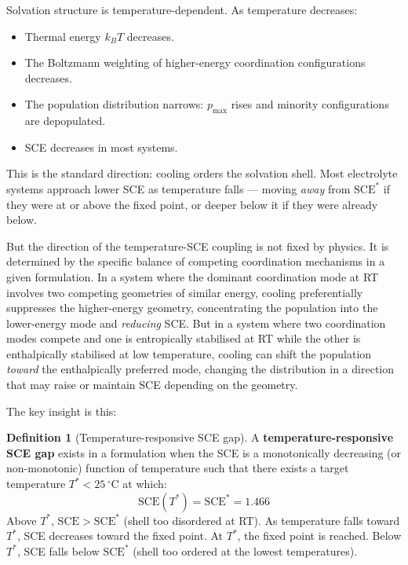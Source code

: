 \documentclass[11pt]{article}
\theoremstyle{plain}
\theoremstyle{definition}
\newtheorem{definition}{Definition}[section]
\theoremstyle{remark}
\begin{document}
Solvation structure is temperature-dependent.  As temperature
decreases:
\begin{itemize}[leftmargin=2em]
  \item Thermal energy $k_BT$ decreases.
  \item The Boltzmann weighting of higher-energy coordination
        configurations decreases.
  \item The population distribution narrows: $p_{\max}$ rises and
        minority configurations are depopulated.
  \item SCE decreases in most systems.
\end{itemize}

This is the standard direction: cooling orders the solvation shell.
Most electrolyte systems approach lower SCE as temperature falls ---
moving \emph{away} from $\mathrm{SCE}^{*}$ if they were at or above
the fixed point, or deeper below it if they were already below.

But the direction of the temperature-SCE coupling is not fixed by
physics.  It is determined by the specific balance of competing
coordination mechanisms in a given formulation.  In a system where
the dominant coordination mode at RT involves two competing geometries
of similar energy, cooling preferentially suppresses the higher-energy
geometry, concentrating the population into the lower-energy mode and
\emph{reducing} SCE.  But in a system where two coordination modes
compete and one is entropically stabilised at RT while the other is
enthalpically stabilised at low temperature, cooling can shift the
population \emph{toward} the enthalpically preferred mode, changing
the distribution in a direction that may raise or maintain SCE
depending on the geometry.

The key insight is this:

\begin{definition}[Temperature-responsive SCE gap]
A \textbf{temperature-responsive SCE gap} exists in a formulation
when the SCE is a monotonically decreasing (or non-monotonic)
function of temperature such that there exists a target temperature
$T^{*} < 25\,^\circ\mathrm{C}$ at which:
\begin{equation}
  \mathrm{SCE}(T^{*}) = \mathrm{SCE}^{*} = 1.466
  \label{eq:T_target}
\end{equation}
Above $T^{*}$, $\mathrm{SCE} > \mathrm{SCE}^{*}$ (shell too
disordered at RT).  As temperature falls toward $T^{*}$, SCE
decreases toward the fixed point.  At $T^{*}$, the fixed point
is reached.  Below $T^{*}$, SCE falls below $\mathrm{SCE}^{*}$
(shell too ordered at the lowest temperatures).
\end{definition}
\end{document}
